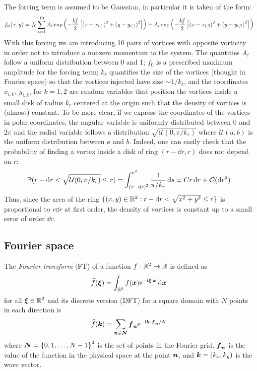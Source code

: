 \documentclass[../main.tex]{subfiles}
\begin{document}
The forcing term is assumed to be Gaussian, in particular it is taken of the form:
\begin{equation}
	f_\psi(x,y) = f_0\sum_{i=1}^{10} A_i \operatorname{exp}\left(-\frac{k_\ell^2}{2}\left[{(x-x_{i,1})}^2 + {(y-y_{i,1})}^2\right]\right) - A_i\operatorname{exp}\left(-\frac{k_\ell^2}{2}\left[{(x-x_{i,2})}^2 + {(y-y_{i,2})}^2\right]\right)
\end{equation}
With this forcing we are introducing 10 pairs of vortices with opposite vorticity in order not to introduce a nonzero momentum to the system. The quantities $A_i$ follow a uniform distribution between 0 and 1; $f_0$ is a prescribed maximum amplitude for the forcing term; $k_\ell$ quantifies the size of the vortices (thought in Fourier space) so that the vortices injected have size $\sim 1/k_\ell$, and the coordinates $x_{i,k}$, $y_{i,k}$, for $k=1,2$ are random variables that position the vortices inside a small disk of radius $k_r$ centered at the origin such that the density of vortices is (almost) constant. To be more clear, if we express the coordinates of the vortices in polar coordinates, the angular variable is uniformly distributed between 0 and $2\pi$ and the radial variable follows a distribution $\sqrt{\mathcal{U}(0,\pi/k_r)}$ where $\mathcal{U}(a,b)$ is the uniform distribution between $a$ and $b$. Indeed, one can easily check that the probability of finding a vortex inside a disk of ring $(r-\dd{r},r)$ does not depend on $r$:
\begin{equation}
	\mathbb{P}(r-\dd{r} < \sqrt{\mathcal{U}(0,\pi/k_r)} \leq r) = \int_{{(r-\dd{r})}^2}^{r^2} \frac{1}{\pi/k_r} \dd{s} \simeq C r \dd{r} + \mathcal{O}(\dd{r}^2)
\end{equation}
Thus, since the area of the ring $\{(x,y) \in \mathbb{R}^2 : r-\dd{r} < \sqrt{x^2+y^2} \leq r\}$ is proportional to $r \dd{r}$ at first order, the density of vortices is constant up to a small error of order $\dd{r}$.
\subsection{Fourier space}
The \emph{Fourier transform} (FT) of a function $f:\mathbb{R}^2 \to \mathbb{R}$ is defined as
\begin{equation}
	\widehat{f}(\boldsymbol{\xi}) = \int_{\mathbb{R}^2} f(\boldsymbol{x}) \mathrm{e}^{-\mathrm{i} \boldsymbol{\xi} \cdot \boldsymbol{x}} \dd{\boldsymbol{x}}
\end{equation}
for all $\boldsymbol{\xi}\in\mathbb{R}^2$ and its discrete version (DFT) for a square domain with $N$ points in each direction is
\begin{equation}
	\widehat{f}(\boldsymbol{k}) = \sum_{\boldsymbol{n}\in\boldsymbol{N}} \boldsymbol{f}_{\boldsymbol{n}} \mathrm{e}^{-\mathrm{i} \boldsymbol{k} \cdot \boldsymbol{f}_{\boldsymbol{n}}/N}
\end{equation}
where $\boldsymbol{N} = {\{0,1,\ldots,N-1\}}^2$ is the set of points in the Fourier grid, $\boldsymbol{f}_{\boldsymbol{n}}$ is the value of the function in the physical space at the point $\boldsymbol{n}$, and $\boldsymbol{k} = (k_x,k_y)$ is the wave vector.
\end{document}
